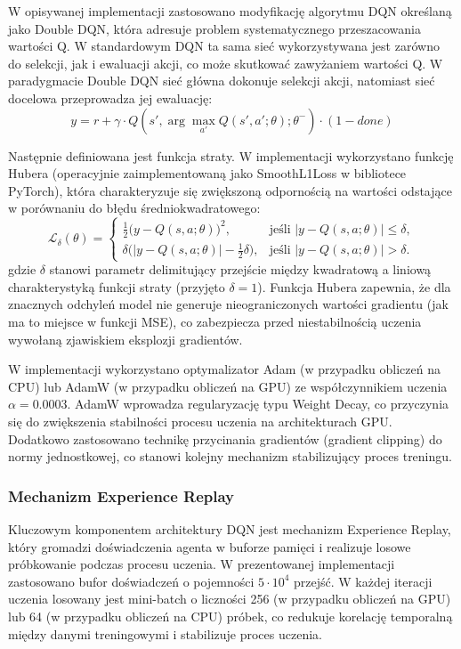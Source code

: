 \documentclass[a4paper,12pt]{article}
\begin{document}
W opisywanej implementacji zastosowano modyfikację algorytmu DQN określaną jako Double DQN, która adresuje problem systematycznego przeszacowania wartości Q. W standardowym DQN ta sama sieć wykorzystywana jest zarówno do selekcji, jak i ewaluacji akcji, co może skutkować zawyżaniem wartości Q. W paradygmacie Double DQN sieć główna dokonuje selekcji akcji, natomiast sieć docelowa przeprowadza jej ewaluację:
\begin{equation}
y = r + \gamma \cdot Q(s', \arg\max_{a'} Q(s',a';\theta); \theta^-) \cdot (1 - done)
\end{equation}

Następnie definiowana jest funkcja straty. W implementacji wykorzystano funkcję Hubera (operacyjnie zaimplementowaną jako SmoothL1Loss w bibliotece PyTorch), która charakteryzuje się zwiększoną odpornością na wartości odstające w porównaniu do błędu średniokwadratowego:
\begin{equation}
\mathcal{L}_\delta(\theta) =
\begin{cases}
\tfrac12\bigl(y - Q(s,a;\theta)\bigr)^2, & \text{jeśli } |y - Q(s,a;\theta)| \le \delta,\\
\delta\bigl(|y - Q(s,a;\theta)| - \tfrac12\delta\bigr), & \text{jeśli } |y - Q(s,a;\theta)| > \delta.
\end{cases}
\end{equation}
gdzie \(\delta\) stanowi parametr delimitujący przejście między kwadratową a liniową charakterystyką funkcji straty (przyjęto \(\delta=1\)). Funkcja Hubera zapewnia, że dla znacznych odchyleń model nie generuje nieograniczonych wartości gradientu (jak ma to miejsce w funkcji MSE), co zabezpiecza przed niestabilnością uczenia wywołaną zjawiskiem eksplozji gradientów. 

W implementacji wykorzystano optymalizator Adam (w przypadku obliczeń na CPU) lub AdamW (w przypadku obliczeń na GPU) ze współczynnikiem uczenia \(\alpha=0.0003\). AdamW wprowadza regularyzację typu Weight Decay, co przyczynia się do zwiększenia stabilności procesu uczenia na architekturach GPU. Dodatkowo zastosowano technikę przycinania gradientów (gradient clipping) do normy jednostkowej, co stanowi kolejny mechanizm stabilizujący proces treningu.

\subsubsection{Mechanizm Experience Replay}

Kluczowym komponentem architektury DQN jest mechanizm Experience Replay, który gromadzi doświadczenia agenta w buforze pamięci i realizuje losowe próbkowanie podczas procesu uczenia. W prezentowanej implementacji zastosowano bufor doświadczeń o pojemności \(5 \cdot 10^4\) przejść. W każdej iteracji uczenia losowany jest mini-batch o liczności 256 (w przypadku obliczeń na GPU) lub 64 (w przypadku obliczeń na CPU) próbek, co redukuje korelację temporalną między danymi treningowymi i stabilizuje proces uczenia. 
\end{document}
